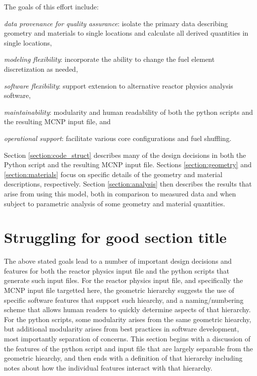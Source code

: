\documentclass{UWNR_modeling}
\begin{document}
The goals of this effort include:\vspace{-0.9\parsep}
\begin{myitemize}
\item \textit{data provenance for quality assurance}: isolate the primary data describing geometry and materials to single locations and calculate all derived quantities in single locations,
\item \textit{modeling flexibility}: incorporate the ability to change the fuel element discretization as needed,
\item \textit{software flexibility}: support extension to alternative reactor physics analysis software,
\item \textit{maintainability}: modularity and human readability of both the python scripts and the resulting MCNP input file, and
\item \textit{operational support}: facilitate various core configurations and fuel shuffling.
\end{myitemize}

Section \ref{section:code_struct} describes many of the design decisions in both the Python script and the resulting MCNP input file.  Sections \ref{section:geometry} and \ref{section:materials} focus on specific details of the geometry and material descriptions, respectively.  Section \ref{section:analysis} then describes the results that arise from using this model, both in comparison to measured data and when subject to parametric analysis of some geometry and material quantities.

\section{Struggling for good section title}\label{section:structure}

The above stated goals lead to a number of important design decisions and features for both the reactor physics input file and the python scripts that generate such input files.  For the reactor physics input file, and specifically the MCNP input file targetted here, the geometric hierarchy suggests the use of specific software features that support such hiearchy, and a naming/numbering scheme that allows human readers to quickly determine aspects of that hierarchy.  For the python scripts, some modularity arises from the same geometric hiearchy, but additional modularity arises from best practices in software development, most importantly separation of concerns.  This section begins with a discussion of the features of the python script and input file that are largely separable from the geometric hiearchy, and then ends with a definition of that hierarchy including notes about how the individual features interact with that hierarchy.
\end{document}
